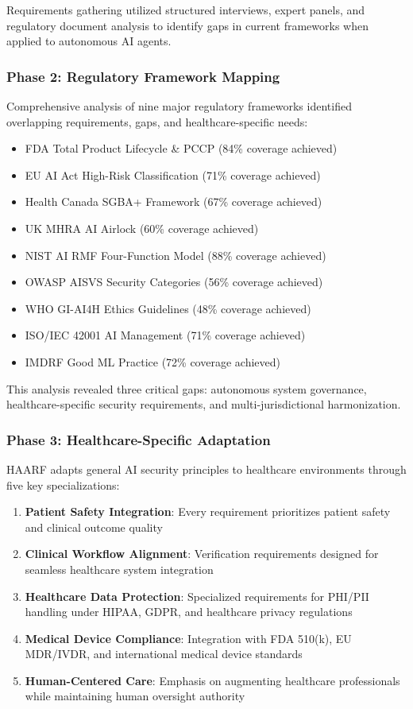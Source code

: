 \documentclass[11pt]{article}
\begin{document}
Requirements gathering utilized structured interviews, expert panels, and regulatory document analysis to identify gaps in current frameworks when applied to autonomous AI agents.

\subsubsection{Phase 2: Regulatory Framework Mapping}

Comprehensive analysis of nine major regulatory frameworks identified overlapping requirements, gaps, and healthcare-specific needs:

\begin{itemize}
    \item FDA Total Product Lifecycle \& PCCP (84\% coverage achieved)
    \item EU AI Act High-Risk Classification (71\% coverage achieved)
    \item Health Canada SGBA+ Framework (67\% coverage achieved)
    \item UK MHRA AI Airlock (60\% coverage achieved)
    \item NIST AI RMF Four-Function Model (88\% coverage achieved)
    \item OWASP AISVS Security Categories (56\% coverage achieved)
    \item WHO GI-AI4H Ethics Guidelines (48\% coverage achieved)
    \item ISO/IEC 42001 AI Management (71\% coverage achieved)
    \item IMDRF Good ML Practice (72\% coverage achieved)
\end{itemize}

This analysis revealed three critical gaps: autonomous system governance, healthcare-specific security requirements, and multi-jurisdictional harmonization.

\subsubsection{Phase 3: Healthcare-Specific Adaptation}

HAARF adapts general AI security principles to healthcare environments through five key specializations:

\begin{enumerate}
    \item \textbf{Patient Safety Integration}: Every requirement prioritizes patient safety and clinical outcome quality
    \item \textbf{Clinical Workflow Alignment}: Verification requirements designed for seamless healthcare system integration
    \item \textbf{Healthcare Data Protection}: Specialized requirements for PHI/PII handling under HIPAA, GDPR, and healthcare privacy regulations
    \item \textbf{Medical Device Compliance}: Integration with FDA 510(k), EU MDR/IVDR, and international medical device standards
    \item \textbf{Human-Centered Care}: Emphasis on augmenting healthcare professionals while maintaining human oversight authority
\end{enumerate}
\end{document}
